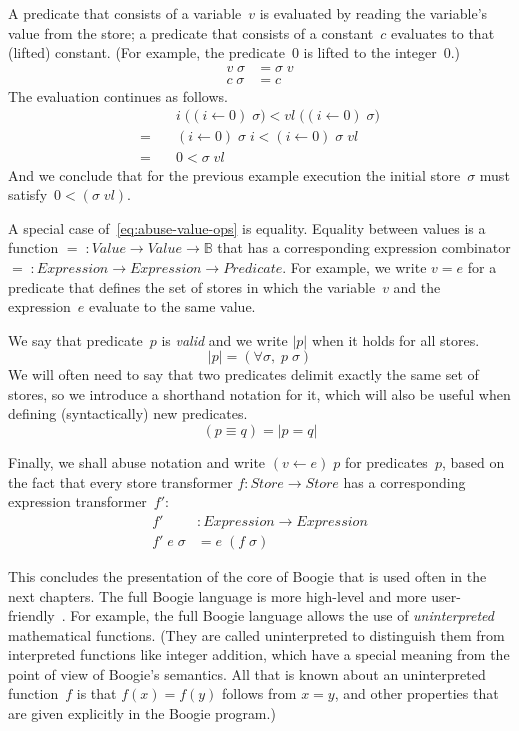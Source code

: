 \documentclass[a4paper]{article}
\theoremstyle{slanted}
\theoremstyle{definition}
\theoremstyle{remark}
\begin{document}
A predicate that consists of a variable~$v$ is
evaluated by reading the variable's value from the store; a
predicate that consists of a constant~$c$ evaluates to that
(lifted) constant. (For example, the predicate~$0$ is lifted to
the integer~$0$.)
\begin{align}
  v\;\sigma&=\sigma\;v\\
  c\;\sigma&=c
\end{align}
The evaluation continues as follows.
\begin{align}
    &i\;\big((i\gets0)\;\sigma\big) < \mathit{vl}\;\big((i\gets0)\;\sigma\big)\\
=\quad &(i\gets0)\;\sigma\;i < (i\gets0)\;\sigma\;\mathit{vl} \\
=\quad &0<\sigma\;\mathit{vl}
\end{align}
And we conclude that for the previous example execution
the initial store~$\sigma$ must satisfy~$0<(\sigma\;\mathit{vl})$.

A special case of~\eqref{eq:abuse-value-ops} is
equality. Equality between values is a function
$=\;:\mathit{Value}\to\mathit{Value}\to\mathbb{B}$ that has a
corresponding expression combinator $=\;:\mathit{Expression}\to
\mathit{Expression}\to \mathit{Predicate}$. For example, we write
$v=e$ for a predicate that defines the set of stores in which the
variable~$v$ and the expression~$e$ evaluate to the same value.

We say that predicate~$p$ is \emph{valid} and we write $|p|$ when
it holds for all stores.
\begin{equation}
|p|=(\forall\sigma,\;p\;\sigma)
\end{equation}
We will often need to say that two predicates delimit exactly
the same set of stores, so we introduce a shorthand notation for
it, which will also be useful when defining (syntactically) new
predicates.
\begin{equation}
(p\equiv q) = |p=q|
\end{equation}

Finally, we shall abuse notation and write $(v \gets e)\;p$ for
predicates~$p$, based on the fact that every store transformer
$f:\mathit{Store}\to\mathit{Store}$ has a corresponding
expression transformer~$f'$:
\begin{align}
f' &: \mathit{Expression}\to\mathit{Expression} \\
f'\;e\;\sigma &= e\;(f\;\sigma)
\end{align}

This concludes the presentation of the core of
Boogie that is used often in the next chapters. The
full Boogie language is more high-level and more
user-friendly~\cite{leino2008boogie,leino2010boogie}.
For example, the full Boogie language allows the use of
\emph{uninterpreted} mathematical functions. (They are called
uninterpreted to distinguish them from interpreted functions
like integer addition, which have a special meaning from the
point of view of Boogie's semantics. All that is known about
an uninterpreted function~$f$ is that $f(x)=f(y)$ follows from
$x=y$, and other properties that are given explicitly in the
Boogie program.)
\end{document}
